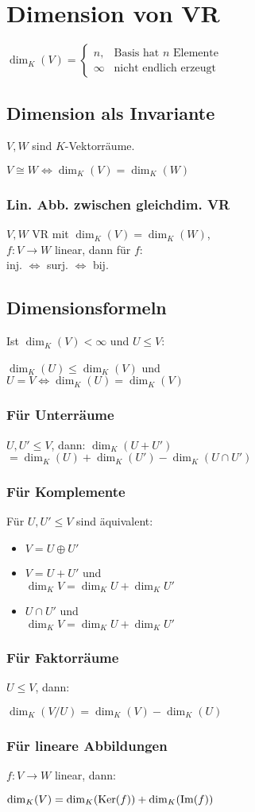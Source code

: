\section*{Dimension von VR}

$\dim_K(V)=\begin{cases}
	n, & \text{Basis hat $n$ Elemente}\\
	\infty & \text{nicht endlich erzeugt}
\end{cases}$

\subsection*{Dimension als Invariante}
$V,W$ sind $K$-Vektorräume.

$V \cong W \iff \dim_K(V) = \dim_K(W)$

\subsubsection*{Lin. Abb. zwischen gleichdim. VR}
$V,W$ VR mit $\dim_K(V)=\dim_K(W)$, \\
$f:V\to W$ linear, dann für $f$: \\
inj. $\iff$ surj. $\iff$ bij.

\subsection*{Dimensionsformeln}
Ist $\dim_K(V)<\infty$ und $U \le V$:

$\dim_K(U) \le \dim_K(V)$ und \\
$U = V \iff \dim_K(U) = \dim_K(V)$

\subsubsection*{Für Unterräume}
$U,U' \le V$, dann:
$\dim_K(U+U')$ \\ $=\dim_K(U)+\dim_K(U')-\dim_K(U\cap U')$

\subsubsection*{Für Komplemente}
Für $U,U' \le V$ sind äquivalent:
\begin{itemize}
	\item $V=U \oplus U'$
	\item $V=U+U'$ und \\ $\dim_K V = \dim_K U + \dim_K U'$
	\item $U \cap U'$ und \\ $\dim_K V = \dim_K U + \dim_K U'$
\end{itemize}

\subsubsection*{Für Faktorräume}
$U \le V$, dann:

$\dim_K(V/U) = \dim_K(V)-\dim_K(U)$

\subsubsection*{Für lineare Abbildungen}
$f: V \to W$ linear, dann:

$\dim_K(V) = \dim_K(\operatorname{Ker}(f)) + \dim_K(\operatorname{Im}(f))$
